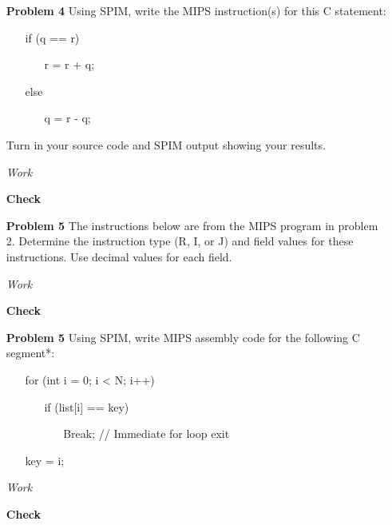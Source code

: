 \documentclass[12pt]{article}
\begin{document}
\begin{enumerate}
  \item[\textbf{Problem 4}] Using SPIM, write the MIPS instruction(s) for this C statement:
  \begin{enumerate}\ttfamily
    \item[] if  (q == r)
    \begin{enumerate}
      \item[] r = r + q;
    \end{enumerate}
    \item[] else
    \begin{enumerate}
      \item[] q = r - q;
    \end{enumerate}
  \end{enumerate}
	\item[]Turn in your source code and SPIM output showing your results.
\end{enumerate}

\begin{enumerate}
  \item[\textit{Work}]
  \item[\textbf{Check}]
\end{enumerate}



\begin{enumerate}
  \item[\textbf{Problem 5}] The instructions below are from the MIPS program in problem 2.  Determine the instruction type (R, I, or J) and field values for these instructions.  Use decimal values for each field.
\end{enumerate}

\begin{enumerate}
  \item[\textit{Work}]
  \item[\textbf{Check}]
\end{enumerate}






\begin{enumerate}
  \item[\textbf{Problem 5}] Using SPIM, write MIPS assembly code for the following C segment*:
  \begin{enumerate}\ttfamily
    \item[] for (int i = 0; i < N; i++)
    \begin{enumerate}
      \item[] if (list[i] == key)
      \begin{enumerate}
        \item[] Break; // Immediate for loop exit
      \end{enumerate}
    \end{enumerate}
    \item[] key = i;
  \end{enumerate}
\end{enumerate}

\begin{enumerate}
  \item[\textit{Work}]
  \item[\textbf{Check}]
\end{enumerate}
\end{document}
